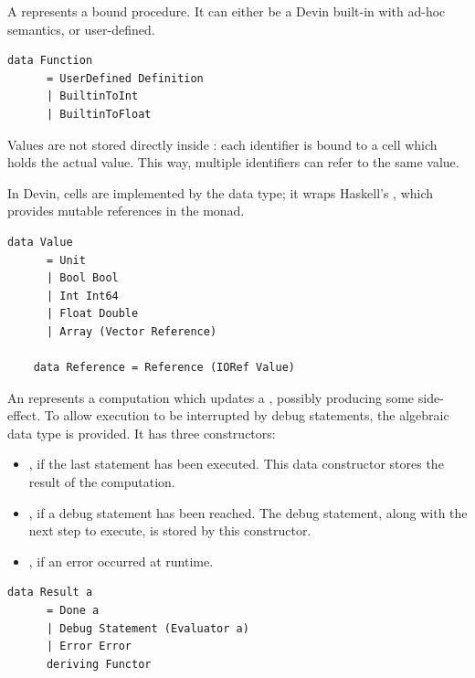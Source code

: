 \documentclass[UdineBachThesis,american,11pt]{PhdThesis}
\begin{document}
  A \lstinline@Function@ represents a bound procedure. It can either be a Devin
  built-in with ad-hoc semantics, or user-defined.

  \begin{lstlisting}[gobble=4,basicstyle=\ttfamily\small]
    data Function
      = UserDefined Definition
      | BuiltinToInt
      | BuiltinToFloat
  \end{lstlisting}

  Values are not stored directly inside \lstinline@State@: each identifier is
  bound to a cell which holds the actual value. This way, multiple identifiers
  can refer to the same value.

  \pagebreak

  In Devin, cells are implemented by the \lstinline@Reference@ data type; it
  wraps Haskell's \lstinline@IORef@, which provides mutable references in the
  \lstinline@IO@ monad.

  \begin{lstlisting}[gobble=4,basicstyle=\ttfamily\small]
    data Value
      = Unit
      | Bool Bool
      | Int Int64
      | Float Double
      | Array (Vector Reference)

    data Reference = Reference (IORef Value)
  \end{lstlisting}

  An \lstinline@Evaluator@ represents a computation which updates a
  \lstinline@State@, possibly producing some side-effect. To allow execution to
  be interrupted by debug statements, the algebraic data type \lstinline@Result@
  is provided. It has three constructors:

  \begin{itemize}
    \item \lstinline@Done@, if the last statement has been executed. This data
    constructor stores the result of the computation.

    \item \lstinline@Debug@, if a debug statement has been reached. The debug
    statement, along with the next step to execute, is stored by this
    constructor.

    \item \lstinline@Error@, if an error occurred at runtime.
  \end{itemize}

  \begin{lstlisting}[gobble=4,basicstyle=\ttfamily\small]
    data Result a
      = Done a
      | Debug Statement (Evaluator a)
      | Error Error
      deriving Functor
  \end{lstlisting}
\end{document}
